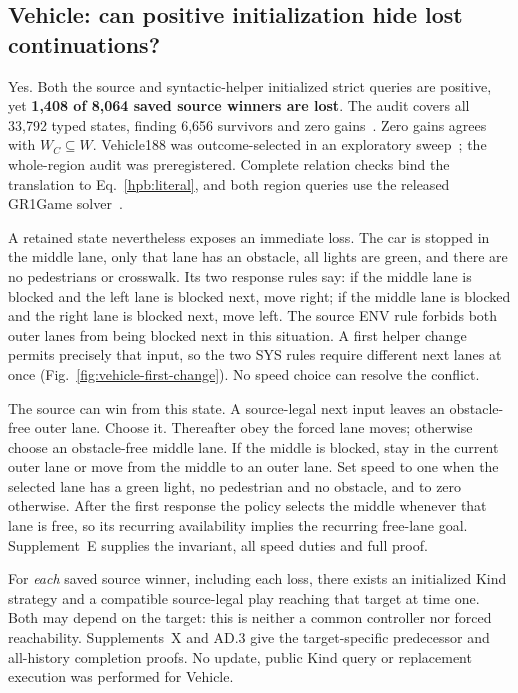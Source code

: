 \subsection{Vehicle: can positive initialization hide lost continuations?}
Yes. Both the source and syntactic-helper initialized strict queries are
positive, yet \textbf{1,408 of 8,064 saved source winners are lost}.
The audit covers all 33,792 typed states, finding 6,656 survivors and zero
gains~\cite{vehiclewholeartifact}. Zero gains agrees with $W_C\subseteq W$.
Vehicle188 was outcome-selected in an exploratory sweep~\cite{vehicleartifact};
the whole-region audit was preregistered. Complete relation checks bind the
translation to Eq.~\eqref{hpb:literal}, and both region queries use the
released GR1Game solver~\cite{spectra}.

A retained state nevertheless exposes an immediate loss. The car is stopped
in the middle lane, only that lane has an obstacle, all lights are green,
and there are no pedestrians or crosswalk. Its two response rules say:
if the middle lane is blocked and the left lane is blocked next, move right;
if the middle lane is blocked and the right lane is blocked next, move left.
The source ENV rule forbids both outer lanes from being blocked next in
this situation. A first helper change permits precisely that input, so the
two SYS rules require different next lanes at once
(Fig.~\ref{fig:vehicle-first-change}). No speed choice can resolve the conflict.


The source can win from this state. A source-legal next input leaves an
obstacle-free outer lane. Choose it. Thereafter obey the forced lane moves;
otherwise choose an obstacle-free middle lane. If the middle is blocked,
stay in the current outer lane or move from the middle to an outer lane. Set speed to one when the selected lane has a green
light, no pedestrian and no obstacle, and to zero otherwise. After the first
response the policy selects the middle whenever that lane is free, so its
recurring availability implies the recurring free-lane goal.
Supplement~E supplies the invariant, all speed duties and full proof.

For \emph{each} saved source winner, including each loss, there exists an
initialized Kind strategy and a compatible source-legal play reaching that
target at time one. Both may depend on the target: this is neither a common
controller nor forced reachability. Supplements~X and AD.3 give the
target-specific predecessor and all-history completion proofs. No update,
public Kind query or replacement execution was performed for Vehicle.
